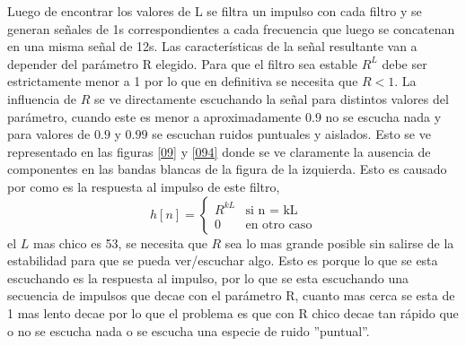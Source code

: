 \documentclass[a4paper]{article}
\begin{document}
\newline
Luego de encontrar los valores de L se filtra un impulso con cada filtro y se generan señales de 1s correspondientes a cada frecuencia que luego se concatenan en una misma señal de 12s. Las características de la señal resultante van a depender del parámetro R elegido. Para que el filtro sea estable $R^L$ debe ser estrictamente menor a 1 por lo que en definitiva se necesita que $R<1$. La influencia de $R$ se ve directamente escuchando la señal para distintos valores del parámetro, cuando este es menor a aproximadamente $0.9$ no se escucha nada y para valores de $0.9$ y $0.99$ se escuchan ruidos puntuales y aislados. Esto se ve representado en las figuras \ref{09} y \ref{094} donde se ve claramente la ausencia de componentes en las bandas blancas de la figura de la izquierda. Esto es causado por como es la respuesta al impulso de este filtro, 
$$
h[n] = 
\begin{cases}
R^{kL} & \text{si n = kL}\\
0 &\text{en otro caso}
\end{cases}
$$
el $L$ mas chico es 53, se necesita que $R$ sea lo mas grande posible sin salirse de la estabilidad para que se pueda ver/escuchar algo. Esto es porque lo que se esta escuchando es la respuesta al impulso, por lo que se esta escuchando una secuencia de impulsos que decae con el parámetro R, cuanto mas cerca se esta de 1 mas lento decae por lo que el problema es que con R chico decae tan rápido que o no se escucha nada o se escucha una especie de ruido ''puntual''.
\end{document}
